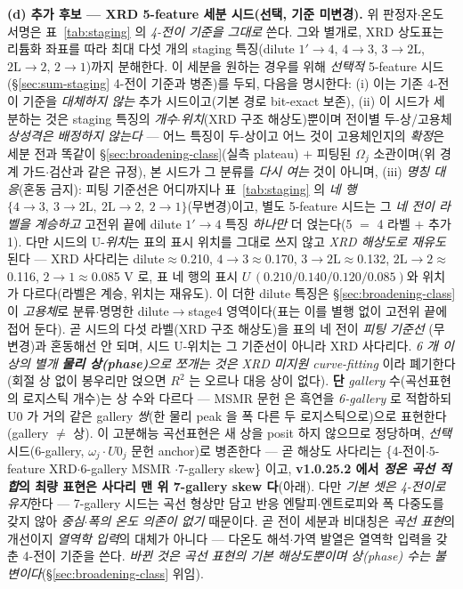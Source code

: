 \textbf{(d) 추가 후보 --- XRD 5-feature 세분 시드(선택, 기준 미변경).} 위 판정자$\cdot$온도 서명은
표~\ref{tab:staging} 의 \emph{4-전이 기준을 그대로} 쓴다. 그와 별개로, XRD 상도표는 리튬화 좌표를 따라 최대
다섯 개의 staging 특징(dilute $1'\!\to\!4$, $4\!\to\!3$, $3\!\to\!2\mathrm L$, $2\mathrm L\!\to\!2$, $2\!\to\!1$)까지
분해한다\cite{dahn1991}. 이 세분을 원하는 경우를 위해 \emph{선택적} 5-feature 시드
(\S\ref{sec:sum-staging} 4-전이 기준과 병존)를 두되, 다음을 명시한다:
(i) 이는 기존 4-전이 기준을 \emph{대체하지 않는} 추가 시드이고(기본 경로 bit-exact 보존),
(ii) 이 시드가 세분하는 것은 staging 특징의 \emph{개수$\cdot$위치}(XRD 구조 해상도)뿐이며 전이별
두-상/고용체 \emph{상성격은 배정하지 않는다} --- 어느 특징이 두-상이고 어느 것이 고용체인지의 \emph{확정}은
세분 전과 똑같이 \S\ref{sec:broadening-class}(실측 plateau) $+$ 피팅된 $\Omega_j$ 소관이며(위 경계 가드$\cdot$검산과
같은 규정), 본 시드가 그 분류를 \emph{다시 여는} 것이 아니며,
(iii) \emph{명칭 대응}(혼동 금지): 피팅 기준선은 어디까지나 표~\ref{tab:staging} 의 \emph{네 행}
$\{4\!\to\!3,\ 3\!\to\!2\mathrm L,\ 2\mathrm L\!\to\!2,\ 2\!\to\!1\}$(무변경)이고, 별도
5-feature 시드는 그 \emph{네 전이 라벨을 계승하고} 고전위 끝에 dilute
$1'\!\to\!4$ 특징 \emph{하나만} 더 얹는다(5 $=$ 4 라벨 $+$ 추가 1). 다만 시드의 U-\emph{위치}는 표의 표시 위치를
그대로 쓰지 않고 \emph{XRD 해상도로 재유도}된다 --- XRD 사다리는 dilute$\approx$0.210, $4\!\to\!3\approx$0.170,
$3\!\to\!2\mathrm L\approx$0.132, $2\mathrm L\!\to\!2\approx$0.116, $2\!\to\!1\approx$0.085 V 로, 표 네 행의 표시
$U\,(0.210/0.140/0.120/0.085)$와 위치가 다르다(라벨은 계승, 위치는 재유도). 이 더한 dilute 특징은
\S\ref{sec:broadening-class} 이 \emph{고용체}로 분류$\cdot$명명한 dilute$\to$stage4 영역이다(표는 이를 별행 없이
고전위 끝에 접어 둔다). 곧 시드의 다섯 라벨(XRD 구조 해상도)을 표의 네 전이 \emph{피팅 기준선}
(무변경)과 혼동해선 안 되며, 시드 U-위치는 그 기준선이 아니라 XRD 사다리다.
\emph{6 개 이상의 별개 \textbf{물리 상(phase)}으로 쪼개는 것은 XRD 미지원 curve-fitting} 이라 폐기한다(회절 상 없이
봉우리만 얹으면 $R^2$ 는 오르나 대응 상이 없다). \textbf{단} \emph{gallery} 수(곡선표현의 로지스틱 개수)는 상 수와
다르다 --- MSMR 문헌\cite{verbrugge2017} 은 흑연을 \emph{6-gallery} 로 적합하되 U0 가 거의 같은 gallery
\emph{쌍}(한 물리 peak 을 폭 다른 두 로지스틱으로)으로 표현한다(gallery $\ne$ 상). 이 고분해능 곡선표현은 새 상을
posit 하지 않으므로 정당하며, \emph{선택} 시드(6-gallery, $\omega_j\cdot U0_j$
문헌 anchor)로 병존한다 --- 곧 해상도 사다리는 \{4-전이$\cdot$5-feature XRD$\cdot$6-gallery MSMR
$\cdot$7-gallery skew\} 이고, \textbf{v1.0.25.2 에서 \emph{정온 곡선 적합}의 최량 표현은 사다리 맨 위 7-gallery skew 다}(아래).
다만 \emph{기본 셋은 4-전이로 유지}한다 --- 7-gallery 시드는 곡선 형상만 담고 반응 엔탈피$\cdot$엔트로피와
폭 다중도를 갖지 않아 \emph{중심$\cdot$폭의 온도 의존이 없기} 때문이다. 곧 전이 세분과 비대칭은
\emph{곡선 표현}의 개선이지 \emph{열역학 입력}의 대체가 아니다 --- 다온도 해석$\cdot$가역 발열은
열역학 입력을 갖춘 4-전이 기준을 쓴다.
\emph{바뀐 것은 곡선 표현의 기본 해상도뿐이며 상(phase) 수는 불변이다}(\S\ref{sec:broadening-class} 위임).


